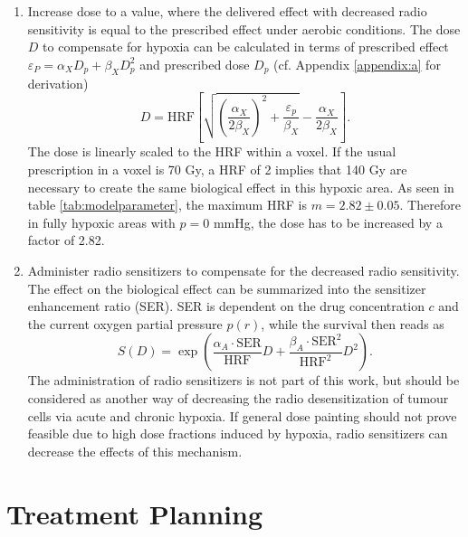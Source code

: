 \begin{enumerate}
\item Increase dose to a value, where the delivered effect with decreased radio sensitivity is equal to the prescribed effect under aerobic conditions. The dose $D$ to compensate for hypoxia can be calculated in terms of prescribed effect $\varepsilon_P = \alpha_XD_p + \beta_XD_p^2$ and prescribed dose $D_p$ (cf. Appendix \ref{appendix:a} for derivation)
\begin{equation}\label{eq:dosecompensation}
D = \mathrm{HRF}\left[\sqrt{\left(\frac{\alpha_X}{2\beta_X}\right)^2 + \frac{\varepsilon_p}{\beta_X}}-\frac{\alpha_X}{2\beta_X}\right].
\end{equation}
The dose is linearly scaled to the HRF within a voxel. If the usual prescription in a voxel is 70 Gy, a HRF of 2 implies that 140 Gy are necessary to create the same biological effect in this hypoxic area. As seen in table \ref{tab:modelparameter}, the maximum HRF is $m=2.82\pm 0.05$. Therefore in fully hypoxic areas with $p=0$ mmHg, the dose has to be increased by a factor of 2.82.
\item Administer radio sensitizers to compensate for the decreased radio sensitivity. The effect on the biological effect can be summarized into the sensitizer enhancement ratio (SER). SER is dependent on the drug concentration $c$ and the current oxygen partial pressure $p(r)$, while the survival then reads as \cite{pmid21183291}
\begin{equation}
S(D) = \exp\left(\frac{\alpha_A\cdot\mathrm{SER}}{\mathrm{HRF}}D + \frac{\beta_A\cdot\mathrm{SER}^2}{\mathrm{HRF}^2}D^2\right).
\end{equation}
The administration of radio sensitizers is not part of this work, but should be considered as another way of decreasing the radio desensitization of tumour cells via acute and chronic hypoxia. If general dose painting should not prove feasible due to high dose fractions induced by hypoxia, radio sensitizers can decrease the effects of this mechanism.
\end{enumerate}
\section{Treatment Planning}
